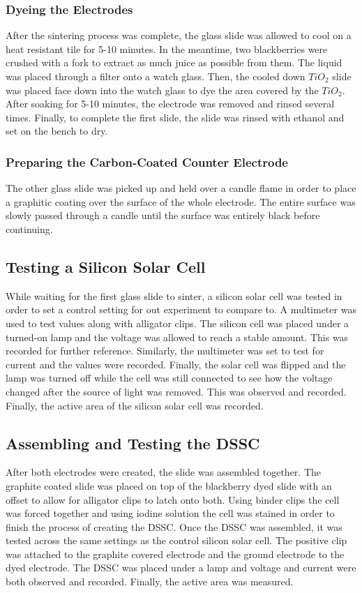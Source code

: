 \documentclass{article}
\begin{document}
\subsubsection{Dyeing the Electrodes}
After the sintering process was complete, the glass slide was allowed to cool on a heat resistant tile for 5-10 minutes. In the meantime, two blackberries were crushed with a fork to extract as much juice as possible from them. The liquid was placed through a filter onto a watch glass. Then, the cooled down $TiO_2$ slide was placed face down into the watch glass to dye the area covered by the $TiO_2$. After soaking for 5-10 minutes, the electrode was removed and rinsed several times. Finally, to complete the first slide, the slide was rinsed with ethanol and set on the bench to dry.

\subsubsection{Preparing the Carbon-Coated Counter Electrode}
The other glass slide was picked up and held over a candle flame in order to place a graphitic coating over the surface of the whole electrode. The entire surface was slowly passed through a candle until the surface was entirely black before continuing. 

\subsection{Testing a Silicon Solar Cell}
While waiting for the first glass slide to sinter, a silicon solar cell was tested in order to set a control setting for out experiment to compare to. A multimeter was used to test values along with alligator clips. The silicon cell was placed under a turned-on lamp and the voltage was allowed to reach a stable amount. This was recorded for further reference. Similarly, the multimeter was set to test for current and the values were recorded. Finally, the solar cell was flipped and the lamp was turned off while the cell was still connected to see how the voltage changed after the source of light was removed. This was observed and recorded. Finally, the active area of the silicon solar cell was recorded. 

\subsection{Assembling and Testing the DSSC}
After both electrodes were created, the slide was assembled together. The graphite coated slide was placed on top of the blackberry dyed slide with an offset to allow for alligator clips to latch onto both. Using binder clips the cell was forced together and using iodine solution the cell was stained in order to finish the process of creating the DSSC. Once the DSSC was assembled, it was tested across the same settings as the control silicon solar cell. The positive clip was attached to the graphite covered electrode and the ground electrode to the dyed electrode. The DSSC was placed under a lamp and voltage and current were both observed and recorded. Finally, the active area was measured.
\end{document}
